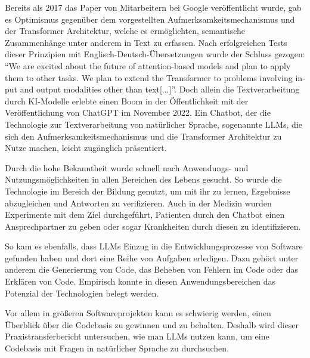 \documentclass[../main.tex]{subfiles}
\begin{document}
Bereits als 2017 das Paper  von Mitarbeitern bei Google veröffentlicht wurde, gab es Optimismus gegenüber dem vorgestellten Aufmerksamkeitsmechanismus und der Transformer Architektur, welche es ermöglichten, semantische Zusammenhänge unter anderem in Text zu erfassen.
Nach erfolgreichen Tests dieser Prinzipien mit Englisch-Deutsch-Übersetzungen wurde der Schluss gezogen: \foreignquote{english}{We are excited about the future of attention-based models and plan to apply them to other tasks. We plan to extend the Transformer to problems involving input and output modalities other than text[...]}\cite*{vaswani2017attention}.
Doch allein die Textverarbeitung durch KI-Modelle erlebte einen Boom in der Öffentlichkeit mit der Veröffentlichung von ChatGPT im November 2022.
Ein Chatbot, der die Technologie zur Textverarbeitung von natürlicher Sprache, sogenannte \glspl{LLM}, die sich den Aufmerksamkeitsmechanismus und die Transformer Architektur zu Nutze machen, leicht zugänglich präsentiert. \cite{chatgpt2023}

Durch die hohe Bekanntheit wurde schnell nach Anwendungs- und Nutzungsmöglichkeiten in allen Bereichen des Lebens gesucht.
So wurde die Technologie im Bereich der Bildung genutzt, um mit ihr zu lernen, Ergebnisse abzugleichen und Antworten zu verifizieren.
Auch in der Medizin wurden Experimente mit dem Ziel durchgeführt, Patienten durch den Chatbot einen Ansprechpartner zu geben oder sogar Krankheiten durch diesen zu identifizieren.
\cite*{liu2023summary}

So kam es ebenfalls, dass \glspl{LLM} Einzug in die Entwicklungsprozesse von Software gefunden haben und dort eine Reihe von Aufgaben erledigen.
Dazu gehört unter anderem die Generierung von Code, das Beheben von Fehlern im Code oder das Erklären von Code.
Empirisch konnte in diesen Anwendungsbereichen das Potenzial der Technologien belegt werden.
\cite*{tian2023chatgpt}

Vor allem in größeren Softwareprojekten kann es schwierig werden, einen Überblick über die Codebasis zu gewinnen und zu behalten.
Deshalb wird dieser Praxistransferbericht untersuchen, wie man \glspl{LLM} nutzen kann, um eine Codebasis mit Fragen in natürlicher Sprache zu durchsuchen.
\end{document}
